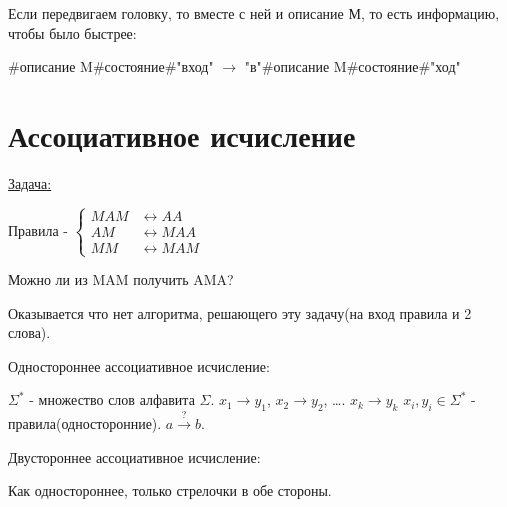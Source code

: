 Если передвигаем головку, то вместе с ней и описание М, то есть информацию, чтобы было быстрее:

\#описание M\#состояние\#"вход" $\rightarrow$ "в"\#описание M\#состояние\#"ход"

\section{Ассоциативное исчисление}
\underline{Задача:}

Правила - $\left\{
	\begin{aligned}
	MAM &\longleftrightarrow AA \\
	AM &\longleftrightarrow MAA \\
	MM &\longleftrightarrow MAM 
	\end{aligned}
\right.$

Можно ли из MAM получить AMA? 

Оказывается что нет алгоритма, решающего эту задачу(на вход правила и 2 слова).

\begin{Def}
	Одностороннее ассоциативное исчисление:
	
	$\Sigma^{*}$ - множество слов алфавита $\Sigma$. $x_1 \rightarrow y_1$, $x_2 \rightarrow y_2$, \dots. $x_k \rightarrow y_k$
	$x_i, y_i \in \Sigma^{*}$ - правила(односторонние). $a \xrightarrow{?} b$.

    Двустороннее ассоциативное исчисление:

    Как одностороннее, только стрелочки в обе стороны.
\end{Def}

